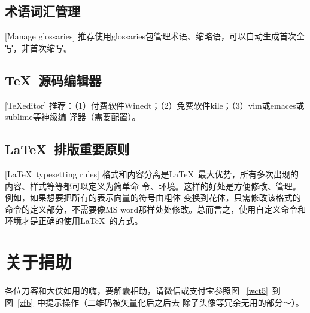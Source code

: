 \subsection{术语词汇管理}[Manage glossaries]
推荐使用glossaries包管理术语、缩略语，可以自动生成首次全写，非首次缩写。

\subsection{\TeX\ 源码编辑器}[\TeX editor]
推荐：（1）付费软件Winedt；（2）免费软件kile；（3）vim或emaces或sublime等神级编
译器（需要配置）。

\subsection{\LaTeX\ 排版重要原则}[\LaTeX\ typesetting rules]
格式和内容分离是\LaTeX\ 最大优势，所有多次出现的内容、样式等等都可以定义为简单命
令、环境。这样的好处是方便修改、管理。例如，如果想要把所有的表示向量的符号由粗体
变换到花体，只需修改该格式的命令的定义部分，不需要像MS
word那样处处修改。总而言之，使用自定义命令和环境才是正确的使用\LaTeX\ 的方式。

\section{关于捐助}
各位刀客和大侠如用的嗨，要解囊相助，请微信或支付宝参照图
~\ref{wct5}~到图~\ref{zfb}~中提示操作（二维码被矢量化后之后去
除了头像等冗余无用的部分～）。

\begin{figure}[!h]
\setlength{\subfigcapskip}{-1bp}
\centering
\subfigure{\label{wct5}}\addtocounter{subfigure}{-1}
\hspace{2em}
\subfigure{\label{wct10}}\addtocounter{subfigure}{-1}
\subfigure{\label{wct1}}\addtocounter{subfigure}{-1}
\hspace{2em}
\subfigure{\label{zfb}}\addtocounter{subfigure}{-1}
\vspace{0.2em}
\end{figure}

